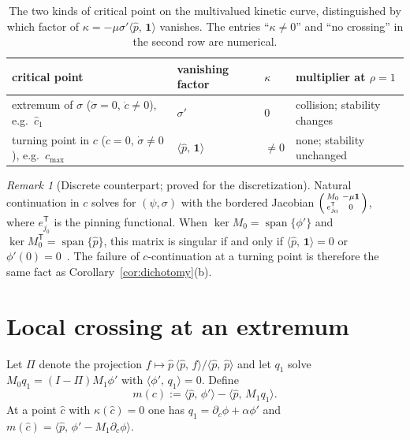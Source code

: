 \documentclass[11pt]{article}
\theoremstyle{plain}
\theoremstyle{definition}
\theoremstyle{remark}
\newtheorem{remark}[theorem]{Remark}
\newcommand{\ip}[2]{\langle #1,\,#2\rangle}
\newcommand{\ph}{\hat p}
\newcommand{\one}{\mathbf 1}
\newcommand{\T}{\mathsf T}
\newcommand{\chat}{\hat c_1}
\newcommand{\cmax}{c_{\max}}
\newcommand{\tagP}{\textsf{proved}}
\newcommand{\tagN}{\textsf{numerical}}
\begin{document}
\begin{table}[h]
\centering\small
\caption{The two kinds of critical point on the multivalued kinetic curve, distinguished by
which factor of $\kappa=-\mu\sigma'\ip{\ph}{\one}$ vanishes. The entries
``$\kappa\neq0$'' and ``no crossing'' in the second row are \tagN.}
\label{tab:dichotomy}
\begin{tabular}{@{}llll@{}}
\toprule
critical point & vanishing factor & $\kappa$ & multiplier at $\rho=1$\\
\midrule
extremum of $\sigma$ ($\dot\sigma=0$, $\dot c\neq0$), e.g.\ $\chat$ & $\sigma'$ & $0$ &
collision; stability changes\\
turning point in $c$ ($\dot c=0$, $\dot\sigma\neq0$), e.g.\ $\cmax$ & $\ip{\ph}{\one}$ &
$\neq0$ & none; stability unchanged\\
\bottomrule
\end{tabular}
\end{table}

\begin{remark}[Discrete counterpart; \tagP{} for the discretization]\label{rem:bordered}
Natural continuation in $c$ solves for $(\psi,\sigma)$ with the bordered Jacobian
$\begin{psmallmatrix}M_0&-\mu\one\\ e_{j_0}^{\T}&0\end{psmallmatrix}$, where $e_{j_0}^{\T}$ is
the pinning functional. When $\ker M_0=\operatorname{span}\{\phi'\}$ and
$\ker M_0^{\T}=\operatorname{span}\{\ph\}$, this matrix is singular if and only if
$\ip{\ph}{\one}=0$ or $\phi'(0)=0$~\cite{Kel77}. The failure of $c$-continuation at a turning
point is therefore the same fact as Corollary~\ref{cor:dichotomy}(b).
\end{remark}

\section{Local crossing at an extremum}\label{sec:crossing}

Let $\Pi$ denote the projection $f\mapsto\ph\,\ip{\ph}{f}/\ip{\ph}{\ph}$ and let $q_1$ solve
$M_0q_1=(I-\Pi)M_1\phi'$ with $\ip{\phi'}{q_1}=0$. Define
\begin{equation}\label{eq:m}
  m(c):=\ip{\ph}{\phi'}-\ip{\ph}{M_1q_1}.
\end{equation}
At a point $\hat c$ with $\kappa(\hat c)=0$ one has $q_1=\partial_c\phi+\alpha\phi'$ and
$m(\hat c)=\ip{\ph}{\phi'-M_1\partial_c\phi}$.
\end{document}
